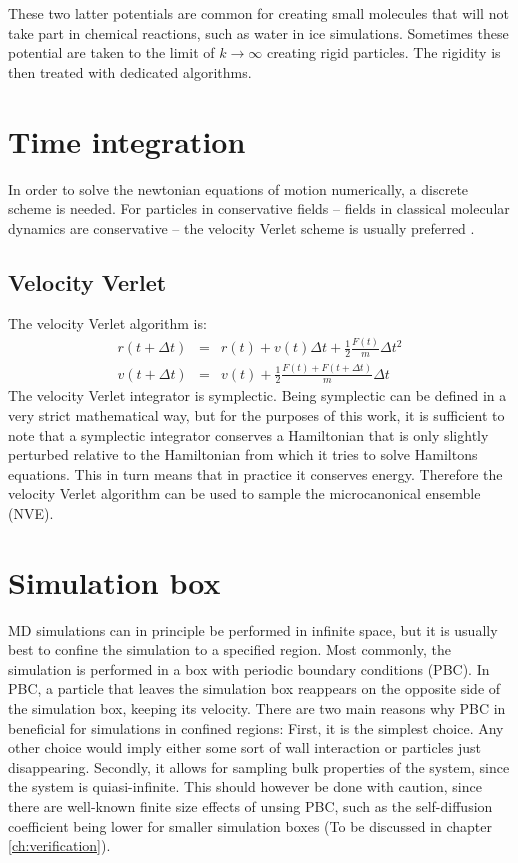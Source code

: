 These two latter potentials are common for creating small molecules that will not take part in chemical reactions, such as water in ice simulations. Sometimes these potential are taken to the limit of $k\to\infty$ creating rigid particles. The rigidity is then treated with dedicated algorithms.

\section{Time integration}
In order to solve the newtonian equations of motion numerically, a discrete scheme is needed. For particles in conservative fields -- fields in classical molecular dynamics are conservative -- the velocity Verlet scheme is usually preferred \cite[p.69]{frenkel2001understanding}. 

\subsection{Velocity Verlet}
The velocity Verlet algorithm is:
\begin{align}
	r(t+\Delta t) &=& r(t) + v(t)\Delta t + \frac{1}{2}\frac{F(t)}{m}\Delta t^2 \\
	v(t + \Delta t) &=& v(t) + \frac{1}{2} \frac{F(t) + F(t+\Delta t)}{m}\Delta t
\end{align}
The velocity Verlet integrator is symplectic. Being symplectic can be defined in a very strict mathematical way, but for the purposes of this work, it is sufficient to note that a symplectic integrator conserves a Hamiltonian that is only slightly perturbed relative to the Hamiltonian from which it tries to solve Hamiltons equations. This in turn means that in practice it conserves energy. Therefore the velocity Verlet algorithm can be used to sample the microcanonical ensemble (NVE).

\section{Simulation box}
MD simulations can in principle be performed in infinite space, but it is usually best to confine the simulation to a specified region. Most commonly, the simulation is performed in a box with periodic boundary conditions (PBC). In PBC, a particle that leaves the simulation box reappears on the opposite side of the simulation box, keeping its velocity. There are two main reasons why PBC in beneficial for simulations in confined regions: First, it is the simplest choice. Any other choice would imply either some sort of wall interaction or particles just disappearing. Secondly, it allows for sampling bulk properties of the system, since the system is quiasi-infinite. This should however be done with caution, since there are well-known finite size effects of unsing PBC, such as the self-diffusion coefficient being lower for smaller simulation boxes (To be discussed in chapter \ref{ch:verification}).


